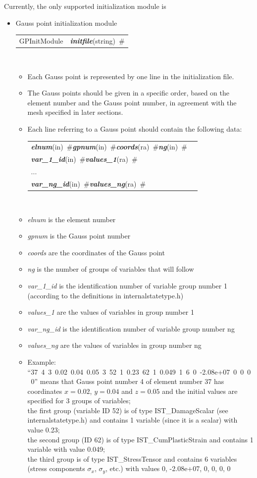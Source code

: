 \documentclass[a4paper]{article}
\makeatletter
\newcommand{\param}[1]{{\em #1}}
\newcommand{\keywordnotype}[1]{\mbox{{\it{\bf{#1}}}}}
\newcommand{\keyword}[2]{\mbox{{\keywordnotype{#1}\tiny (#2)}}}
\newcommand{\field}[2]{\mbox{\keyword{#1}{#2}~\#}}
\newenvironment{record}[1][]{\begin{tabular}{|ll}}{\end{tabular}\\}
\newcommand{\recentry}[2]{{#1}&{#2}\\}
\newcounter{rcc}
\newenvironment{record}[1][\textwidth]{\setcounter{rcc}{0}\begin{tabular*}{#1}{|ll@{\extracolsep{\fill}}r}}{\end{tabular*}\\}
\newcommand{\recentry}[2]{\ifthenelse{\value{rcc}>0}{&$\backslash$ \\}{\setcounter{rcc}{1}}{#1}&{#2}}
\makeatother
\begin{document}
Currently, the only supported initialization module is 
\begin{itemize}
\item Gauss point initialization module

\begin{record}[0.9\textwidth]
    \recentry{GPInitModule}{\field{initfile}{string}}  \end{record}
\begin{itemize}
\item
Each Gauss point is represented by one line in the initialization file.
\item
The Gauss points should be given in a specific order, based on the element number and the Gauss point number, in agreement with the mesh specified in later sections.
\item 
Each line referring to a Gauss point should contain the following data:
\begin{record}
\recentry{\field{elnum}{in}\;\;\;\field{gpnum}{in}\;\;\;\field{coords}{ra}\;\;\;\field{ng}{in}}{}
\recentry{\field{var\_1\_id}{in}\;\;\;\field{values\_1}{ra}}{}
\recentry{\;\;\;...}{}
\recentry{\field{var\_ng\_id}{in}\;\;\;\field{values\_ng}{ra}}{}
\end{record}
   \item \param{elnum} is the element number
   \item \param{gpnum} is the Gauss point number
   \item \param{coords} are the coordinates of the Gauss point
   \item \param{ng} is the number of groups of variables that will follow
   \item   \param{var\_1\_id} is the identification number of variable group number 1 (according to the definitions in internalstatetype.h)
    \item  \param{values\_1} are the values of variables in group number 1
   \item   \param{var\_ng\_id} is the identification number of variable group number ng
    \item  \param{values\_ng} are the values of variables in group number ng
\item Example:\\ \mbox{``37 4 3 0.02 0.04 0.05 3 52 1 0.23 62 1 0.049 1 6 0 -2.08e+07 0 0 0 0''} means that Gauss point number 4 of element number 37 has coordinates $x=0.02$, $y=0.04$ and $z=0.05$ and the initial values are specified for 3 groups of variables;\\ 
the first group (variable ID 52) is of type IST\_DamageScalar (see internalstatetype.h) and contains 1 variable (since it is a scalar) with value 0.23;\\
 the second group (ID 62) is of type IST\_CumPlasticStrain
and contains 1 variable with value 0.049;\\
 the third group is of type IST\_StressTensor
and contains 6 variables (stress components $\sigma_x$, $\sigma_y$, etc.) with values
0, -2.08e+07, 0, 0, 0, 0
\end{itemize}
\end{itemize}
\end{document}
